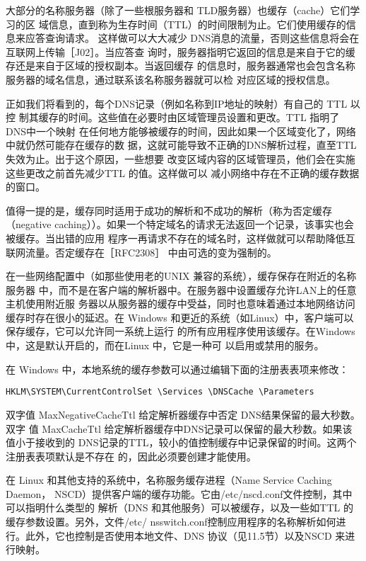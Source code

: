 大部分的名称服务器（除了一些根服务器和 TLD服务器）也缓存（cache）它们学习的区
域信息，直到称为生存时间（TTL）的时间限制为止。它们使用缓存的信息来应答查询请求。
这样做可以大大减少 DNS消息的流量，否则这些信息将会在互联网上传输［J02］。当应答查
询时，服务器指明它返回的信息是来自于它的缓存还是来自于区域的授权副本。当返回缓存
的信息时，服务器通常也会包含名称服务器的域名信息，通过联系该名称服务器就可以检
对应区域的授权信息。

正如我们将看到的，每个DNS记录（例如名称到IP地址的映射）有自己的 TTL 以控
制其缓存的时间。这些值在必要时由区域管理员设置和更改。TTL 指明了 DNS中一个映射
在任何地方能够被缓存的时间，因此如果一个区域变化了，网络中就仍然可能存在缓存的数
据，这就可能导致不正确的DNS解析过程，直至TTL 失效为止。出于这个原因，一些想要
改变区域内容的区域管理员，他们会在实施这些更改之前首先减少TTL 的值。这样做可以
减小网络中存在不正确的缓存数据的窗口。

值得一提的是，缓存同时适用于成功的解析和不成功的解析（称为否定缓存（negative
caching））。如果一个特定域名的请求无法返回一个记录，该事实也会被缓存。当出错的应用
程序一再请求不存在的域名时，这样做就可以帮助降低互联网流量。否定缓存在［RFC2308］
中由可选的变为强制的。

在一些网络配置中（如那些使用老的UNIX 兼容的系统），缓存保存在附近的名称服务器
中，而不是在客户端的解析器中。在服务器中设置缓存允许LAN上的任意主机使用附近服
务器以从服务器的缓存中受益，同时也意味着通过本地网络访问缓存时存在很小的延迟。在
Windows 和更近的系统（如Linux）中，客户端可以保存缓存，它可以允许同一系统上运行
的所有应用程序使用该缓存。在Windows 中，这是默认开启的，而在Linux 中，它是一种可
以启用或禁用的服务。

在 Windows 中，本地系统的缓存参数可以通过编辑下面的注册表表项来修改：

\begin{verbatim}
HKLM\SYSTEM\CurrentControlSet \Services \DNSCache \Parameters
\end{verbatim}

双字值 MaxNegativeCacheTtl 给定解析器缓存中否定 DNS结果保留的最大秒数。双字
值 MaxCacheTtl 给定解析器缓存中DNS记录可以保留的最大秒数。如果该值小于接收到的
DNS记录的TTL，较小的值控制缓存中记录保留的时间。这两个注册表表项默认是不存在
的，因此必须要创建才能使用。

在 Linux 和其他支持的系统中，名称服务缓存进程（Name Service Caching Daemon，
NSCD）提供客户端的缓存功能。它由/etc/nscd.conf文件控制，其中可以指明什么类型的
解析（DNS 和其他服务）可以被缓存，以及一些如TTL 的缓存参数设置。另外，文件/etc/
nsswitch.conf控制应用程序的名称解析如何进行。此外，它也控制是否使用本地文件、DNS
协议（见11.5节）以及NSCD 来进行映射。

